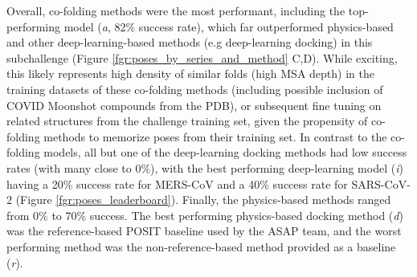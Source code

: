 \documentclass[journal=jcim,manuscript=article]{achemso}
\begin{document}
Overall, co-folding methods were the most performant, including the top-performing model (\textit{a}, 82\% success rate), which far outperformed physics-based and other deep-learning-based methods (e.g deep-learning docking) in this subchallenge (Figure \ref{fgr:poses_by_series_and_method} C,D). While exciting, this likely represents high density of similar folds (high MSA depth) in the training datasets of these co-folding methods (including possible inclusion of COVID Moonshot compounds from the PDB), or subsequent fine tuning on related structures from the challenge training set, given the propensity of co-folding methods to memorize poses from their training set\cite{skrinjar_cofold_mem_2025}. In contrast to the co-folding models, all but one of the deep-learning docking methods had low success rates (with many close to 0\%), with the best performing deep-learning model (\textit{i}) having a 20\% success rate for MERS-CoV and a 40\% success rate for SARS-CoV-2 (Figure \ref{fgr:poses_leaderboard}). Finally, the physics-based methods ranged from 0\% to 70\% success. The best performing physics-based docking method (\textit{d}) was the reference-based POSIT baseline used by the ASAP team, and the worst performing method was the non-reference-based method provided as a baseline (\textit{r}).
\end{document}
